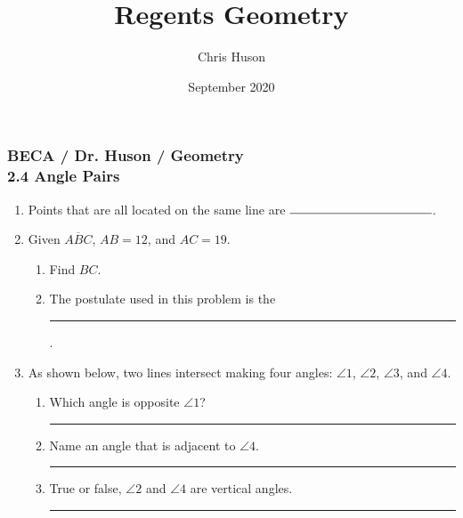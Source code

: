 \documentclass[12pt, twoside]{article}
\title{Regents Geometry}
\author{Chris Huson}
\date{September 2020}
\begin{document}
\subsubsection*{BECA / Dr. Huson / Geometry \\ 2.4 Angle Pairs} %
\begin{enumerate}
\item Points that are all located on the same line are $\rule{4cm}{0.15mm}$. \bigskip

\item Given $\overline{ABC}$, $AB=12$, and $AC=19$.
  \begin{enumerate}
    \item Find ${BC}$.\\[1.5cm]
       \vspace{2cm}
    \item The postulate used in this problem is the \rule{6cm}{0.15mm}.
  \end{enumerate}
  \newpage

\item As shown below, two lines intersect making four angles: $\angle 1$, $\angle 2$, $\angle 3$, and $\angle 4$.
      \begin{center}
      \end{center}
      \begin{enumerate}
      \item Which angle is opposite $\angle 1$? \rule{4cm}{0.15mm} \bigskip
      \item Name an angle that is adjacent to $\angle 4$. \rule{4cm}{0.15mm} \bigskip
      \item True or false, $\angle 2$ and $\angle 4$ are vertical angles. \rule{3cm}{0.15mm}
    \end{enumerate}


\end{enumerate}
\end{document}
